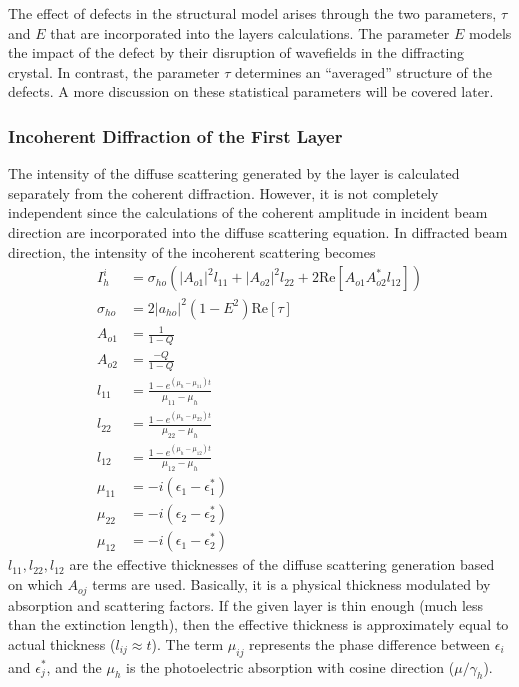 The effect of defects in the structural model arises through the two parameters, $\tau$ and $E$ that are incorporated into the layers calculations. The parameter $E$  models the impact of the defect by their disruption of wavefields in the diffracting crystal. In contrast, the parameter $\tau$ determines an ``averaged'' structure of the defects. A more discussion on these statistical parameters will be covered later.



\subsubsection{Incoherent Diffraction of the First Layer}

The intensity of the diffuse scattering generated by the layer is calculated separately from the coherent diffraction.  However, it is not completely independent since the calculations of the coherent amplitude in incident beam direction are incorporated into the diffuse scattering equation. In diffracted beam direction, the intensity of the incoherent scattering becomes
\begin{align}
I^i_h &= \sigma_{ho} \left(  |A_{o1}|^2 l_{11} + |A_{o2}|^2 l_{22} + 2 \text{Re}[A_{o1} A_{o2}^* l_{12}]\right)\\
\sigma_{ho}&=2 |a_{ho}|^2(1-E^2) \text{Re}[\tau]\\
A_{o1} &= \frac{1}{1-Q}\\
A_{o2} &= \frac{-Q}{1-Q}\\
l_{11} &= \frac{1-e^{(\mu_h -\mu_{11}) t }}{\mu_{11} - \mu_h}\\
l_{22} &= \frac{1-e^{(\mu_h -\mu_{22}) t }}{\mu_{22} - \mu_h}\\
l_{12} &= \frac{1-e^{(\mu_h -\mu_{12}) t }}{\mu_{12} - \mu_h}\\
\mu_{11} &= -i(\epsilon_1 - \epsilon_1^*)\\
\mu_{22} &= -i(\epsilon_2 - \epsilon_2^*)\\
\mu_{12} &= -i(\epsilon_1 - \epsilon_2^*)
\end{align}
$l_{11},l_{22},l_{12}$ are the effective thicknesses of the diffuse scattering generation based on which $A_{oj}$ terms are used.  Basically, it is a physical thickness modulated by absorption and scattering factors.  If the given layer is thin enough (much less than the extinction length), then the effective thickness is approximately equal to actual thickness ($l_{ij} \approx t$).   The term $\mu_{ij}$ represents the phase difference between $\epsilon_i$ and $\epsilon_j^*$, and the  $\mu_h$ is the photoelectric absorption with cosine direction ($\mu/\gamma_h$).

